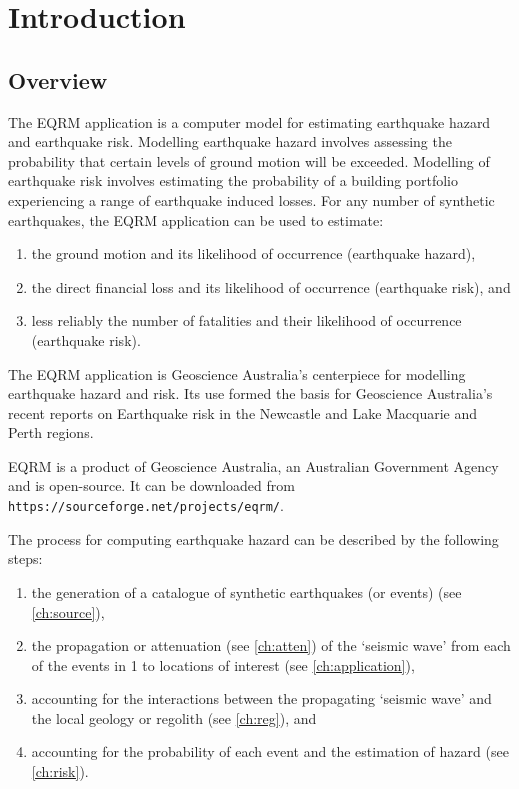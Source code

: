 \chapter{Introduction}
\label{ch:intro}

\section{Overview}

The EQRM application is a computer model for estimating earthquake
hazard and earthquake risk. Modelling earthquake hazard involves
assessing the probability that certain levels of ground motion
will be exceeded. Modelling of earthquake risk involves estimating
the probability of a building portfolio experiencing a range of
earthquake induced losses. For any number of synthetic
earthquakes, the EQRM application can be used to estimate:
\begin{enumerate}
\item the ground motion and its likelihood of occurrence
(earthquake hazard), \item the direct financial loss and its
likelihood of occurrence (earthquake risk), and \item less
reliably the number of fatalities and their
likelihood of occurrence (earthquake risk).
\end{enumerate}

The EQRM application is Geoscience Australia's centerpiece for
modelling earthquake hazard and risk. Its use formed the basis for
Geoscience Australia's recent reports on Earthquake risk in the
Newcastle and Lake Macquarie \citep*{dr_Dhu02a} and Perth
\citep*{dr_Sinadinovski05a} regions.

EQRM is a product of Geoscience Australia, an Australian Government
Agency and is open-source.  It can be downloaded from
\texttt{https://sourceforge.net/projects/eqrm/}.

The process for computing earthquake hazard can be described by
the following steps:
\begin{enumerate}
\item the generation of a catalogue of synthetic earthquakes (or
events) (see \cref{ch:source}), 
\item the propagation or
attenuation (see \cref{ch:atten}) of the `seismic wave' from each
of the events in 1 to locations of interest (see \cref{ch:application}),
\item accounting for the interactions between the propagating
`seismic wave' and the local geology or regolith (see
\cref{ch:reg}), and \item accounting for the probability of each
event and the estimation of hazard (see \cref{ch:risk}).
\end{enumerate}

